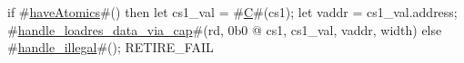 if #\hyperref[sailRISCVzhaveAtomics]{haveAtomics}#() then {
  let cs1_val = #\hyperref[sailRISCVzC]{C}#(cs1);
  let vaddr = cs1_val.address;
  #\hyperref[sailRISCVzhandlezyloadreszydatazyviazycap]{handle\_loadres\_data\_via\_cap}#(rd, 0b0 @ cs1, cs1_val, vaddr, width)
} else {
  #\hyperref[sailRISCVzhandlezyillegal]{handle\_illegal}#();
  RETIRE_FAIL
}

